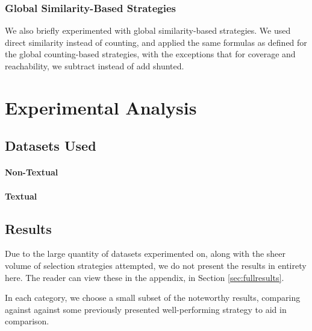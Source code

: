 \documentclass[a4paper,11pt]{report}
\begin{document}
\subsection{Global Similarity-Based Strategies}
We also briefly experimented with global similarity-based strategies. We used direct similarity instead of counting, and applied the same formulas as defined for the global counting-based strategies, with the exceptions that for coverage and reachability, we subtract instead of add shunted.

\chapter{Experimental Analysis\label{cha:expanalysis}}
\section{Datasets Used}


\subsubsection{Non-Textual}

\subsubsection{Textual}

\section{Results}
Due to the large quantity of datasets experimented on, along with the sheer volume of selection strategies attempted, we do not present the results in entirety here. The reader can view these in the appendix, in Section \ref{sec:fullresults}.

In each category, we choose a small subset of the noteworthy results, comparing against against some previously presented well-performing strategy to aid in comparison.

\newpage
\end{document}
